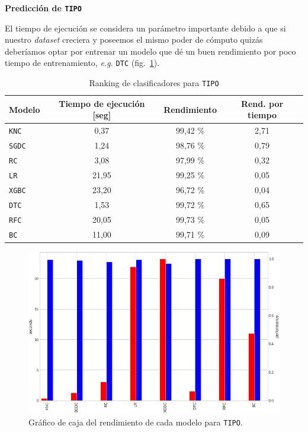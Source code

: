 \documentclass[a4paper,12pt]{article}
\begin{document}
\textbf{Predicción de \texttt{TIPO}}

El tiempo de ejecución se considera un parámetro importante debido a que si nuestro \textit{dataset} creciera y poseemos el mismo poder de cómputo quizás deberíamos optar por entrenar un modelo que dé un buen rendimiento por poco tiempo de entrenamiento, \textit{e.g.} \texttt{DTC} (fig.~\ref{fig:modeltxtipo}).

\begin{table}[H]
\centering
\begin{tabular}{lccc}
\textbf{Modelo} & \textbf{Tiempo de ejecución} [seg] & \textbf{Rendimiento} & \textbf{Rend. por tiempo} \\ \hline
\texttt{KNC}  & 0,37  & 99,42 \% & 2,71 \\
\texttt{SGDC} & 1,24  & 98,76 \% & 0,79 \\
\texttt{RC}   & 3,08  & 97,99 \% & 0,32 \\
\texttt{LR}   & 21,95 & 99,25 \% & 0,05 \\
\texttt{XGBC} & 23,20 & 96,72 \% & 0,04 \\
\texttt{DTC}  & 1,53  & 99,72 \% & 0,65 \\
\texttt{RFC}  & 20,05 & 99,73 \% & 0,05 \\
\texttt{BC}   & 11,00 & 99,71 \% & 0,09
\end{tabular}
\caption{Ranking de clasificadores para \texttt{TIPO}}
\label{tab:classifiers-table}
\end{table}

\begin{figure}[H]
	\begin{center}
	\includegraphics[width=1\textwidth]{tipotimes.png}
  	\caption{Gráfico de caja del rendimiento de cada modelo para \texttt{TIPO}.}
  	\label{fig:modeltxtipo}
  	\end{center}
\end{figure}
\end{document}
